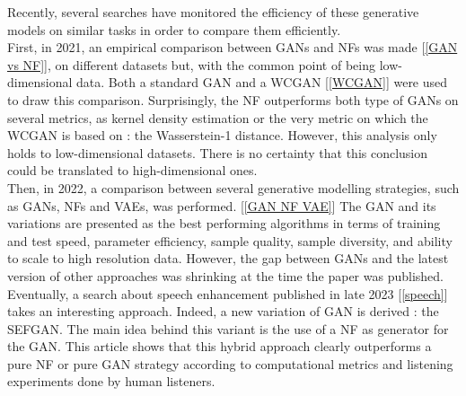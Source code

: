 \documentclass [12pt] {article}
\numberwithin{equation}{section} %
\numberwithin{figure}{section}   %
\begin{document}

Recently, several searches have monitored the efficiency of these generative models on similar tasks in order to compare them efficiently.\\
First, in 2021, an empirical comparison between GANs and NFs was made [\ref{GAN vs NF}], on different datasets but, with the common point of being low-dimensional data. Both a standard GAN and a WCGAN [\ref{WCGAN}] were used to draw this comparison. Surprisingly, the NF outperforms both type of GANs on several metrics, as kernel density estimation or the very metric on which the WCGAN is based on : the Wasserstein-1 distance. However, this analysis only holds to low-dimensional datasets. There is no certainty that this conclusion could be translated to high-dimensional ones.\\
Then, in 2022, a comparison between several generative modelling strategies, such as GANs, NFs and VAEs,  was performed. [\ref{GAN NF VAE}] The GAN and its variations are presented as the best performing algorithms in terms of training and test speed, parameter efficiency, sample quality, sample diversity, and ability to scale to high resolution data. However, the gap between GANs and the latest version of other approaches was shrinking at the time the paper was published.\\ 
Eventually, a search about speech enhancement published in late 2023 [\ref{speech}] takes an interesting approach. Indeed, a new variation of GAN is derived : the SEFGAN. The main idea behind this variant is the use of a NF as generator for the GAN. This article shows that this hybrid approach clearly outperforms a pure NF or pure GAN strategy according to computational metrics and listening experiments done by human listeners.

\newpage



\newpage

\appendix



\newpage
\end{document}
